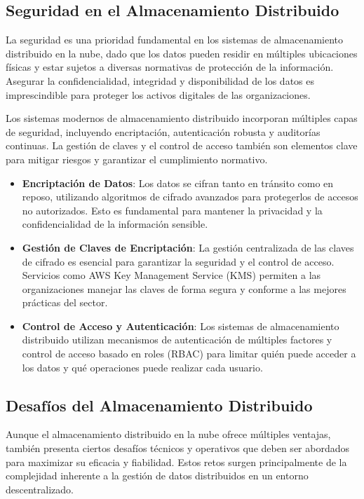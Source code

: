{        \subsection{Seguridad en el Almacenamiento Distribuido}
            La seguridad es una prioridad fundamental en los sistemas de almacenamiento distribuido en la nube, dado que los datos pueden residir en múltiples ubicaciones físicas y estar sujetos a diversas normativas de protección de la información. Asegurar la confidencialidad, integridad y disponibilidad de los datos es imprescindible para proteger los activos digitales de las organizaciones.
            
            Los sistemas modernos de almacenamiento distribuido incorporan múltiples capas de seguridad, incluyendo encriptación, autenticación robusta y auditorías continuas. La gestión de claves y el control de acceso también son elementos clave para mitigar riesgos y garantizar el cumplimiento normativo.
            
            \begin{itemize}
                \item \textbf{Encriptación de Datos}: Los datos se cifran tanto en tránsito como en reposo, utilizando algoritmos de cifrado avanzados para protegerlos de accesos no autorizados. Esto es fundamental para mantener la privacidad y la confidencialidad de la información sensible.
                \item \textbf{Gestión de Claves de Encriptación}: La gestión centralizada de las claves de cifrado es esencial para garantizar la seguridad y el control de acceso. Servicios como AWS Key Management Service (KMS) permiten a las organizaciones manejar las claves de forma segura y conforme a las mejores prácticas del sector.
                \item \textbf{Control de Acceso y Autenticación}: Los sistemas de almacenamiento distribuido utilizan mecanismos de autenticación de múltiples factores y control de acceso basado en roles (RBAC) para limitar quién puede acceder a los datos y qué operaciones puede realizar cada usuario.
            \end{itemize}
            
        \subsection{Desafíos del Almacenamiento Distribuido}
            Aunque el almacenamiento distribuido en la nube ofrece múltiples ventajas, también presenta ciertos desafíos técnicos y operativos que deben ser abordados para maximizar su eficacia y fiabilidad. Estos retos surgen principalmente de la complejidad inherente a la gestión de datos distribuidos en un entorno descentralizado.
            
}
